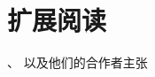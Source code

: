 \section{扩展阅读}\label{sec:扩展阅读2}
\citeauthor{10.1007/978-3-642-61542-9_19}、\citeauthor{10.1145/282957.282969}
以及他们的合作者主张
\citep{10.1007/978-3-642-61542-9_19,10.1145/282957.282969,Mann97acoordinate}